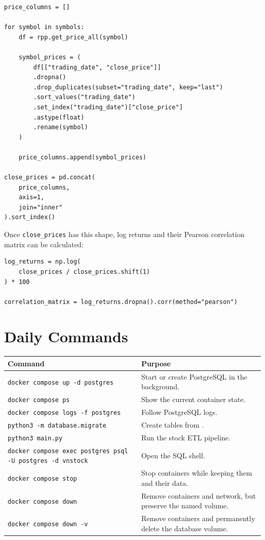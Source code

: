 \documentclass[11pt,a4paper]{article}
\newcommand{\filename}[1]{\texttt{\detokenize{#1}}}
\begin{document}
\begin{lstlisting}[style=python]
price_columns = []

for symbol in symbols:
    df = rpp.get_price_all(symbol)

    symbol_prices = (
        df[["trading_date", "close_price"]]
        .dropna()
        .drop_duplicates(subset="trading_date", keep="last")
        .sort_values("trading_date")
        .set_index("trading_date")["close_price"]
        .astype(float)
        .rename(symbol)
    )

    price_columns.append(symbol_prices)

close_prices = pd.concat(
    price_columns,
    axis=1,
    join="inner"
).sort_index()
\end{lstlisting}

Once \texttt{close\_prices} has this shape, log returns and their Pearson
correlation matrix can be calculated:

\begin{lstlisting}[style=python]
log_returns = np.log(
    close_prices / close_prices.shift(1)
) * 100

correlation_matrix = log_returns.dropna().corr(method="pearson")
\end{lstlisting}

\section{Daily Commands}

\begin{center}
\begin{tabular}{p{6.1cm} p{7.2cm}}
\toprule
\textbf{Command} & \textbf{Purpose} \\
\midrule
\texttt{docker compose up -d postgres}
    & Start or create PostgreSQL in the background. \\[1mm]
\texttt{docker compose ps}
    & Show the current container state. \\[1mm]
\texttt{docker compose logs -f postgres}
    & Follow PostgreSQL logs. \\[1mm]
\texttt{python3 -m database.migrate}
    & Create tables from \filename{schema.sql}. \\[1mm]
\texttt{python3 main.py}
    & Run the stock ETL pipeline. \\[1mm]
\texttt{docker compose exec postgres psql -U postgres -d vnstock}
    & Open the SQL shell. \\[1mm]
\texttt{docker compose stop}
    & Stop containers while keeping them and their data. \\[1mm]
\texttt{docker compose down}
    & Remove containers and network, but preserve the named volume. \\[1mm]
\texttt{docker compose down -v}
    & Remove containers and permanently delete the database volume. \\
\bottomrule
\end{tabular}
\end{center}
\end{document}
